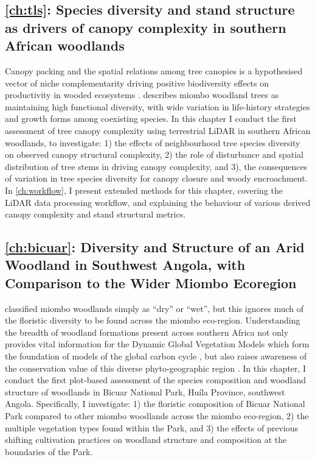 \begin{refsection}
\subsection{\autoref{ch:tls}: Species diversity and stand structure as drivers of canopy complexity in southern African woodlands}
\label{intro:ssec:ch:tls}

Canopy packing and the spatial relations among tree canopies is a hypothesised vector of niche complementarity driving positive biodiversity effects on productivity in wooded ecosystems \citep{Jucker2015, Oehri2020}. \citet{Frost1996} describes miombo woodland trees as maintaining high functional diversity, with wide variation in life-history strategies and growth forms among coexisting species. In this chapter I conduct the first assessment of tree canopy complexity using terrestrial LiDAR in southern African woodlands, to investigate: 1) the effects of neighbourhood tree species diversity on observed canopy structural complexity, 2) the role of disturbance and spatial distribution of tree stems in driving canopy complexity, and 3), the consequences of variation in tree species diversity for canopy closure and woody encroachment. In \autoref{ch:workflow}, I present extended methods for this chapter, covering the LiDAR data processing workflow, and explaining the behaviour of various derived canopy complexity and stand structural metrics.

\subsection{\autoref{ch:bicuar}: Diversity and Structure of an Arid Woodland in Southwest Angola, with Comparison to the Wider Miombo Ecoregion}
\label{intro:ssec:ch:bicuar}

\citet{White1983} classified miombo woodlands simply as ``dry'' or ``wet'', but this ignores much of the floristic diversity to be found across the miombo eco-region. Understanding the breadth of woodland formations present across southern Africa not only provides vital information for the Dynamic Global Vegetation Models which form the foundation of models of the global carbon cycle \citep{Conradi2020}, but also raises awareness of the conservation value of this diverse phyto-geographic region \citep{Jew2016}. In this chapter, I conduct the first plot-based assessment of the species composition and woodland structure of woodlands in Bicuar National Park, Hu\'{i}la Province, southwest Angola. Specifically, I investigate: 1) the floristic composition of Bicuar National Park compared to other miombo woodlands across the miombo eco-region, 2) the multiple vegetation types found within the Park, and 3) the effects of previous shifting cultivation practices on woodland structure and composition at the boundaries of the Park.


\end{refsection}
